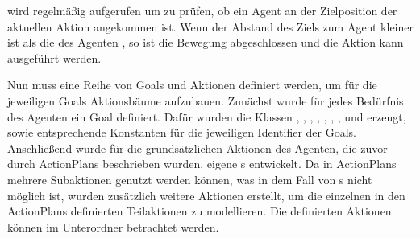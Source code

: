  wird regelmäßig aufgerufen um zu prüfen, ob ein Agent an der Zielposition der aktuellen Aktion angekommen ist. Wenn der Abstand des Ziels zum Agent kleiner ist als die  des Agenten , so ist die Bewegung abgeschlossen und die Aktion kann ausgeführt werden.

Nun muss eine Reihe von Goals und Aktionen definiert werden, um für die jeweiligen Goals Aktionsbäume aufzubauen. Zunächst wurde für jedes Bedürfnis des Agenten ein Goal definiert. Dafür wurden die Klassen , , , , , , ,  und  erzeugt, sowie entsprechende Konstanten für die jeweiligen Identifier der Goals.
Anschließend wurde für die grundsätzlichen Aktionen des Agenten, die zuvor durch ActionPlans beschrieben wurden, eigene s entwickelt. Da in ActionPlans mehrere Subaktionen genutzt werden können, was in dem Fall von s nicht möglich ist, wurden zusätzlich weitere Aktionen erstellt, um die einzelnen in den ActionPlans definierten Teilaktionen zu modellieren. Die definierten Aktionen können im Unterordner  betrachtet werden.



